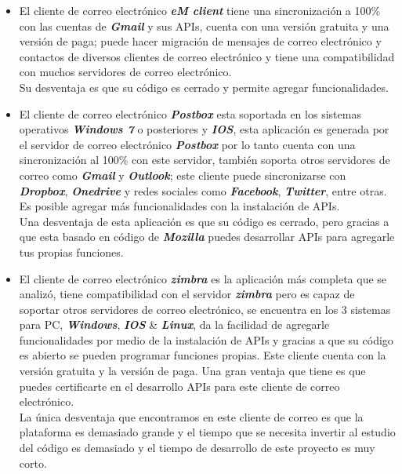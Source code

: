 \documentclass[12pt,oneside,onecolumn,openany]{report}
\begin{document}
\begin{itemize}
 \item El cliente de correo electrónico \textbf{\textit{eM client}} tiene una sincronización a 100\% con las cuentas de \textbf{\textit{Gmail}} y sus APIs, cuenta con una versión gratuita y una versión de paga; puede hacer migración de mensajes de correo electrónico y contactos de diversos clientes de correo electrónico y tiene una compatibilidad con muchos servidores de correo electrónico.\cite{em}\\Su desventaja es que su código es cerrado y permite agregar funcionalidades.
 \item El cliente de correo electrónico \textbf{\textit{Postbox}} esta soportada en los sistemas operativos \textbf{\textit{Windows 7}} o posteriores y \textbf{\textit{IOS}}, esta aplicación es generada por el servidor de correo electrónico \textbf{\textit{Postbox}} por lo tanto cuenta con una sincronización al 100\% con este servidor, también soporta otros servidores de correo como \textbf{\textit{Gmail}} y \textbf{\textit{Outlook}}; este cliente puede sincronizarse con \textbf{\textit{Dropbox}}, \textbf{\textit{Onedrive}} y redes sociales como \textbf{\textit{Facebook}}, \textbf{\textit{Twitter}}, entre otras. Es posible agregar más funcionalidades con la instalación de APIs.\\Una desventaja de esta aplicación es que su código es cerrado, pero gracias a que esta basado en código de \textbf{\textit{Mozilla}} puedes desarrollar APIs para agregarle tus propias funciones. \cite{box}
 \item El cliente de correo electrónico \textbf{\textit{zimbra}} es la aplicación más completa que se analizó, tiene compatibilidad con el servidor \textbf{\textit{zimbra}} pero es capaz de soportar otros servidores de correo electrónico, se encuentra en los 3 sistemas para PC, \textbf{\textit{Windows}}, \textbf{\textit{IOS}} \& \textbf{\textit{Linux}}, da la facilidad de agregarle funcionalidades por medio de la instalación de APIs y gracias a que su código es abierto se pueden programar funciones propias. Este cliente cuenta con la versión gratuita y la versión de paga. Una gran ventaja que tiene es que puedes certificarte en el desarrollo APIs para este cliente de correo electrónico.\cite{zim}\\La única desventaja que encontramos en este cliente de correo es que la plataforma es demasiado grande y el tiempo que se necesita invertir al estudio del código es demasiado y el tiempo de desarrollo de este proyecto es muy corto.

\end{itemize}
\end{document}
